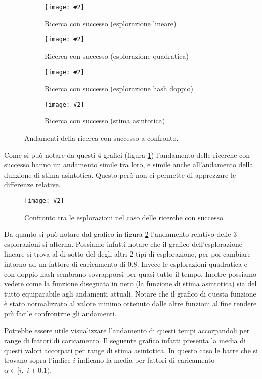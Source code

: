 \documentclass{article}
\newcommand{\image}[3][1]{
	\centering
	\texttt{[image: \#2]}
	\caption{#3}
}
\begin{document}
\begin{figure}[H]
\begin{subfigure}[b]{0.5\textwidth}
\image{Successo_Lineare_scala_logaritmica}{Ricerca con successo (esplorazione lineare)}
\end{subfigure}
\begin{subfigure}[b]{0.5\textwidth}
\image{Successo_Quadratico_scala_logaritmica}{Ricerca con successo (esplorazione quadratica)}
\end{subfigure}
\begin{subfigure}[b]{0.5\textwidth}
\image{Successo_Doppio_scala_logaritmica}{Ricerca con successo (esplorazione hash doppio)}
\end{subfigure}
\begin{subfigure}[b]{0.5\textwidth}
\image{Successo_Asintotica_scala_logaritmica}{Ricerca con successo (stima asintotica)}
\end{subfigure}
\caption{Andamenti della ricerca con successo a confronto.}
\label{fig:Successo_quartetto}
\end{figure}

Come si può notare da questi 4 grafici (figura \ref{fig:Successo_quartetto}) l'andamento delle ricerche con successo hanno un andamento simile tra loro, e simile anche all'andamento della dunzione di stima asintotica. Questo però non ci permette di apprezzare le differenze relative.

\begin{figure}[H]
\image[0.75]{Successo_Confronto_Asintotico_scala_logaritmica}{Confronto tra le esplorazioni nel caso delle ricerche con successo}
\label{fig:Successo_Confronto_Asintotico_scala_logaritmica}
\end{figure} 
Da quanto si può notare dal grafico in figura \ref{fig:Successo_Confronto_Asintotico_scala_logaritmica} l'andamento relativo delle 3 esplorazioni si alterna. Possiamo infatti notare che il grafico dell'esplorazione lineare si trova al di sotto del degli altri 2 tipi di esplorazione, per poi cambiare intorno ad un fattore di caricamento di 0.8. Invece le esplorazioni quadratica e con doppio hash sembrano sovrapporsi per quasi tutto il tempo. Inoltre possiamo vedere come la funzione disegnata in nero (la funzione di stima asintotica) sia del tutto equiparabile agli andamenti attuali. Notare che il grafico di questa funzione è stato normalizzato al valore minimo ottenuto dalle altre funzioni al fine rendere più facile confrontrne gli andamenti. 

Potrebbe essere utile visualizzare l'andamento di questi tempi accorpandoli per range di fattori di caricamento. Il seguente grafico infatti presenta la media di questi valori accorpati per range di stima asintotica. In questo caso le barre che si trovano sopra l'indice $i$ indicano la media per fattori di caricamento $\alpha \in [i,\;i+0.1)$.
\end{document}
